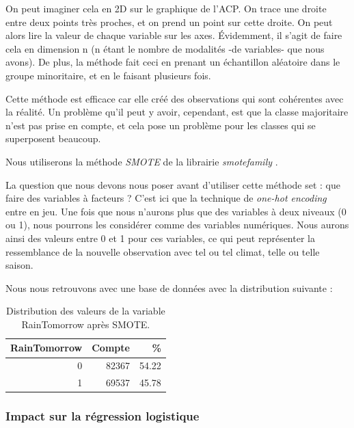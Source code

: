 \documentclass{article}
\begin{document}
On peut imaginer cela en 2D sur le graphique de l'ACP. On trace une droite entre deux points très proches, et on prend un point sur cette droite. On peut alors lire la valeur de chaque variable sur les axes. Évidemment, il s'agit de faire cela en dimension n (n étant le nombre de modalités -de variables- que nous avons). De plus, la méthode fait ceci en prenant un échantillon aléatoire dans le groupe minoritaire, et en le faisant plusieurs fois.

Cette méthode est efficace car elle créé des observations qui sont cohérentes avec la réalité. Un problème qu'il peut y avoir, cependant, est que la classe majoritaire n'est pas prise en compte, et cela pose un problème pour les classes qui se superposent beaucoup. 

Nous utiliserons la méthode \emph{SMOTE} de la librairie \emph{smotefamily} \cite{smotefamily}.

La question que nous devons nous poser avant d'utiliser cette méthode set : que faire des variables à facteurs ? C'est ici que la technique de \emph{one-hot encoding} entre en jeu. Une fois que nous n'aurons plus que des variables à deux niveaux (0 ou 1), nous pourrons les considérer comme des variables numériques. Nous aurons ainsi des valeurs entre 0 et 1 pour ces variables, ce qui peut représenter la ressemblance de la nouvelle observation avec tel ou tel climat, telle ou telle saison. 

Nous nous retrouvons avec une base de données avec la distribution suivante : 

\begin{table}[H]
    \centering
        \begin{tabular}{|rrr|}
            \hline
            RainTomorrow & Compte & \% \\ 
            \hline
            \hline
            0 & 82367 & 54.22 \\
            1 & 69537 & 45.78 \\
            \hline
        \end{tabular}
    \caption{Distribution des valeurs de la variable RainTomorrow après SMOTE.}
\end{table}

\subsubsection{Impact sur la régression logistique}
\end{document}
